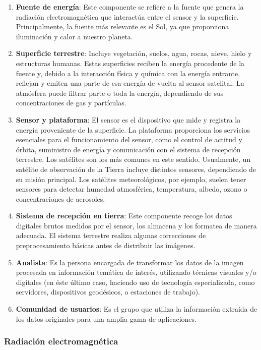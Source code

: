 \begin{enumerate}
    \item \textbf{Fuente de energía}: Este componente se refiere a la fuente que genera la radiación electromagnética que interactúa entre el sensor y la superficie. Principalmente, la fuente más relevante es el Sol, ya que proporciona iluminación y calor a nuestro planeta.
    \item \textbf{Superficie terrestre}: Incluye vegetación, suelos, agua, rocas, nieve, hielo y estructuras humanas. Estas superficies reciben la energía procedente de la fuente y, debido a la interacción física y química con la energía entrante, reflejan y emiten una parte de esa energía de vuelta al sensor satelital. La atmósfera puede filtrar parte o toda la energía, dependiendo de sus concentraciones de gas y partículas.
    \item \textbf{Sensor y plataforma}: El sensor es el dispositivo que mide y registra la energía proveniente de la superficie. La plataforma proporciona los servicios esenciales para el funcionamiento del sensor, como el control de actitud y órbita, suministro de energía y comunicación con el sistema de recepción terrestre. Los satélites son los más comunes en este sentido. Usualmente, un satélite de observación de la Tierra incluye distintos sensores, dependiendo de su misión principal. Los satélites meteorológicos, por ejemplo, suelen tener sensores para detectar humedad atmosférica, temperatura, albedo, ozono o concentraciones de aerosoles.
    \item \textbf{Sistema de recepción en tierra}: Este componente recoge los datos digitales brutos medidos por el sensor, los almacena y los formatea de manera adecuada. El sistema terrestre realiza algunas correcciones de preprocesamiento básicas antes de distribuir las imágenes.
    \item \textbf{Analista}: Es la persona encargada de transformar los datos de la imagen procesada en información temática de interés, utilizando técnicas visuales y/o digitales (en éste último caso, haciendo uso de tecnología especializada, como servidores, dispositivos geodésicos, o estaciones de trabajo).
    \item \textbf{Comunidad de usuarios}: Es el grupo que utiliza la información extraída de los datos originales para una amplia gama de aplicaciones.
\end{enumerate}

\subsubsection{Radiación electromagnética}

